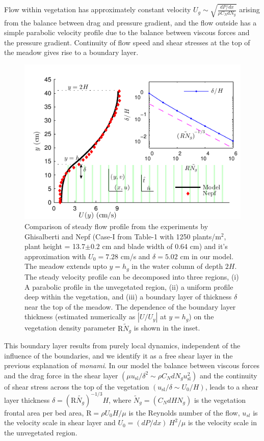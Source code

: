 \documentclass[aps,prl,twocolumn,superscriptaddress,10pt]{revtex4-1}  %
\newcommand{\hg}{h_g}
\newcommand{\Rey}{\text{R}}
\newcommand{\Ndg}{\tilde{N}_g}
\newcommand{\monami}{\textit{monami}}
\begin{document}
Flow within vegetation has approximately constant velocity $U_g \sim \sqrt{\frac{dP/dx}{\rho C_N dN_g}}$ arising from the balance between drag and pressure gradient, and the flow outside has a simple parabolic velocity profile due to the balance between viscous forces and the pressure gradient. 
Continuity of flow speed and shear stresses at the top of the meadow gives rise to a boundary layer.
\begin{figure}
\includegraphics[scale=1]{Grass_Base_Nepf_shear}
\caption{Comparison of steady flow profile from the experiments by Ghisalberti and Nepf \cite{Nepf04} (Case-I from Table-1 with 1250 plants/m$^2$, 
plant height = 13.7$\pm 0.2$ cm and blade width of 0.64 cm)
 and it's approximation with $U_0=7.28$ cm/s and $\delta = 5.02$ cm in our model. The meadow extends upto $y=h_g$ in the water column of depth $2H$. 
The steady velocity profile can be decomposed into three regions, (i) A parabolic profile in the unvegetated region, (ii) a uniform profile deep within the vegetation, and (iii) a boundary layer of thickness $\delta$ near the top of the meadow. 
The dependence of the boundary layer thickness (estimated numerically as $|U/U_y|$ at $y=\hg$) on the vegetation density parameter $\Rey \Ndg$ is shown in the inset.}
\label{basicflow}
\end{figure}
This boundary layer results from purely local dynamics, independent of the influence of the boundaries, and we identify it as a free shear layer \cite{Ghisal02} in the previous explanation of \monami. 
In our model the balance between viscous forces and the drag force in the shear layer $(\mu u_\text{sl}/\delta^2 \sim \rho C_N d N_g u_\text{sl}^2)$ and the continuity of shear stress across the top of the vegetation $(u_\text{sl}/\delta \sim U_0/H)$, leads to a shear layer thickness $\delta=(\Rey\tilde{N_g})^{-1/3}H$, where $\Ndg = \left(C_N d H N_g\right)$ is the vegetation frontal area per bed area, $\Rey=\rho U_0 H/\mu$ is the Reynolds number of the flow, $u_{sl}$ is the velocity scale in shear layer and $U_0 = {(dP/dx)~H^2}/{\mu}$ is the velocity scale in the unvegetated region. 
\end{document}
